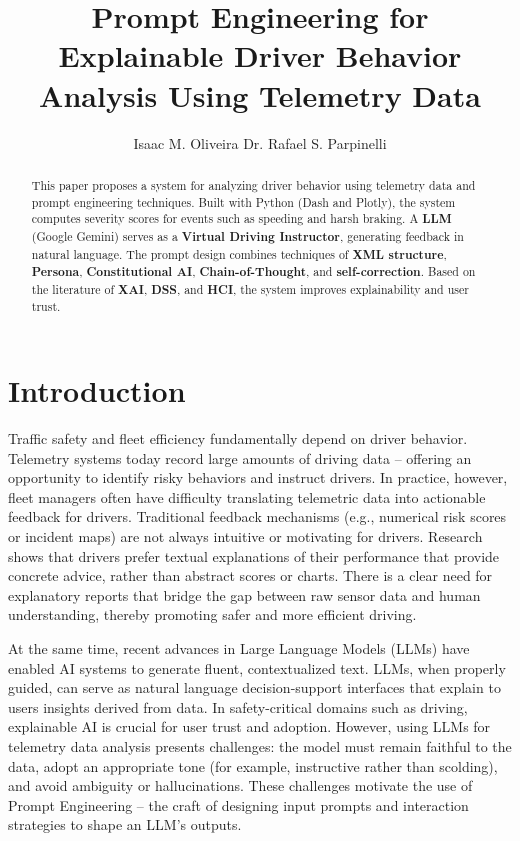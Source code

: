 \documentclass[12pt]{article}
\title{Prompt Engineering for Explainable Driver Behavior Analysis Using Telemetry Data}
\author{Isaac M. Oliveira\inst{1} Dr. Rafael S. Parpinelli\inst{1}}
\begin{document}
\maketitle

\begin{abstract}
This paper proposes a system for analyzing driver behavior using telemetry data and prompt engineering techniques. Built with Python (Dash and Plotly), the system computes severity scores for events such as speeding and harsh braking. A \textbf{LLM} (Google Gemini) serves as a \textbf{Virtual Driving Instructor}, generating feedback in natural language. The prompt design combines techniques of \textbf{XML structure}, \textbf{Persona}, \textbf{Constitutional AI}, \textbf{Chain-of-Thought}, and \textbf{self-correction}. Based on the literature of \textbf{XAI}, \textbf{DSS}, and \textbf{HCI}, the system improves explainability and user trust.
\end{abstract}

\section{Introduction}

Traffic safety and fleet efficiency fundamentally depend on driver behavior. Telemetry systems today record large amounts of driving data – offering an opportunity to identify risky behaviors and instruct drivers. In practice, however, fleet managers often have difficulty translating telemetric data into actionable feedback for drivers. Traditional feedback mechanisms (e.g., numerical risk scores or incident maps) are not always intuitive or motivating for drivers. Research shows that drivers prefer textual explanations of their performance that provide concrete advice, rather than abstract scores or charts. There is a clear need for explanatory reports that bridge the gap between raw sensor data and human understanding, thereby promoting safer and more efficient driving.

At the same time, recent advances in Large Language Models (LLMs) have enabled AI systems to generate fluent, contextualized text. LLMs, when properly guided, can serve as natural language decision-support interfaces that explain to users insights derived from data. In safety-critical domains such as driving, explainable AI is crucial for user trust and adoption. However, using LLMs for telemetry data analysis presents challenges: the model must remain faithful to the data, adopt an appropriate tone (for example, instructive rather than scolding), and avoid ambiguity or hallucinations. These challenges motivate the use of Prompt Engineering – the craft of designing input prompts and interaction strategies to shape an LLM’s outputs.
\end{document}
